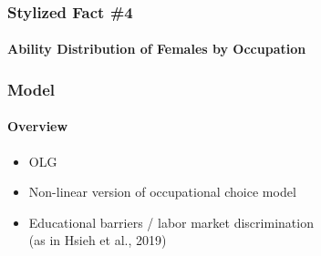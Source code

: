 \documentclass[11pt]{beamer}
\begin{document}
	\begin{frame}
		\frametitle{Stylized Fact \#4}
		\framesubtitle{Ability Distribution of Females by Occupation}
		\begin{adjustwidth}{2em}{2em}
			\vfill
			\begin{figure}[ht!]
				\begin{subfigure}[b]{0.27\textwidth}
					\centering
				\end{subfigure}
				\hfill
				\begin{subfigure}[b]{0.27\textwidth}
					\centering
				\end{subfigure}
				\hfill
				\begin{subfigure}[b]{0.27\textwidth}
					\centering
				\end{subfigure}	
				\vfill	
				\begin{subfigure}[b]{0.27\textwidth}
					\centering
				\end{subfigure}
				\hfill
				\begin{subfigure}[b]{0.27\textwidth}
					\centering
				\end{subfigure}
				\hfill
				\begin{subfigure}[b]{0.27\textwidth}
					\centering
				\end{subfigure}	
			\end{figure}
			\vfill
		\end{adjustwidth}
	\end{frame}
	
	\begin{frame}
		\frametitle{Model}
		\framesubtitle{Overview}
		\begin{itemize}
			\item OLG
			\item Non-linear version of occupational choice model
			\item Educational barriers / labor market discrimination \\
			(as in Hsieh et al., 2019)
		\end{itemize}
	\end{frame}
	
\end{document}

